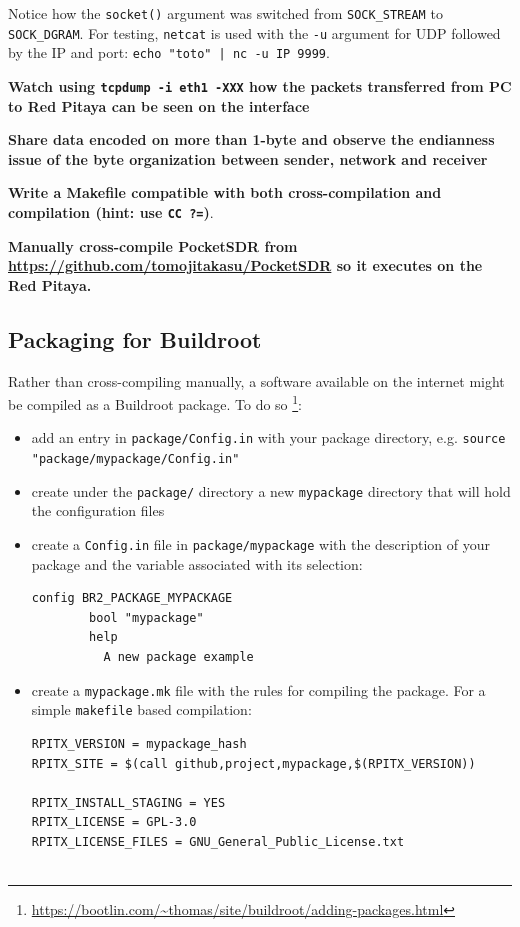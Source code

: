 \documentclass{article}
\begin{document}
{Notice how the {\tt socket()} argument was switched from {\tt SOCK\_STREAM} to {\tt SOCK\_DGRAM}. For
testing, {\tt netcat} is used with the {\tt -u} argument for UDP followed by the IP and port: 
{\tt echo "toto" | nc -u IP 9999}.

{\bf Watch using {\tt tcpdump -i eth1 -XXX} how the packets transferred from PC to Red Pitaya can be seen on the interface}

{\bf Share data encoded on more than 1-byte and observe the endianness issue of the byte organization between
sender, network and receiver}

{\bf Write a Makefile compatible with both cross-compilation and compilation (hint: use {\tt CC ?=})}.
  
{\bf Manually cross-compile PocketSDR from \url{https://github.com/tomojitakasu/PocketSDR} so it executes on the Red Pitaya.}
  
\subsection{Packaging for Buildroot}

Rather than cross-compiling manually, a software available on the internet might be compiled as
a Buildroot package. To do so
\footnote{\url{https://bootlin.com/~thomas/site/buildroot/adding-packages.html}}:

\begin{itemize}
\item add an entry in \verb~package/Config.in~ with your package directory, e.g. \verb~source "package/mypackage/Config.in"~
\item create under the \verb~package/~ directory a new \verb~mypackage~ directory that will hold the configuration files
\item create a \verb~Config.in~ file in \verb#package/mypackage# with the description of your package and the variable
associated with its selection:
\begin{verbatim}
config BR2_PACKAGE_MYPACKAGE
        bool "mypackage"
        help
          A new package example
\end{verbatim}
\item create a \verb~mypackage.mk~ file with the rules for compiling the package. For a simple {\tt makefile} based
compilation:
\begin{verbatim}
RPITX_VERSION = mypackage_hash
RPITX_SITE = $(call github,project,mypackage,$(RPITX_VERSION))

RPITX_INSTALL_STAGING = YES
RPITX_LICENSE = GPL-3.0
RPITX_LICENSE_FILES = GNU_General_Public_License.txt


\end{verbatim}
\end{itemize}}
\end{document}

